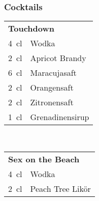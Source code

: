 \subsubsection{Cocktails}
\begin{table}[h!]
  \begin{subtable}[t]{0.3\textwidth}
    \vspace{0pt}
    \begin{tabular}{|rl|} \hline
      \multicolumn{2}{|l|}{\textbf{Touchdown}} \\
      \SI{4}{\centi\litre} & Wodka \\
      \SI{2}{\centi\litre} & Apricot Brandy \\
      \SI{6}{\centi\litre} & Maracujasaft \\
      \SI{2}{\centi\litre} & Orangensaft \\
      \SI{2}{\centi\litre} & Zitronensaft \\
      \SI{1}{\centi\litre} & Grenadinensirup \\ \hline
    \end{tabular}
  \end{subtable}
  ~
  \begin{subtable}[t]{0.3\textwidth}
    \vspace{0pt}
    \begin{tabular}{|rl|} \hline
      \multicolumn{2}{|l|}{\textbf{Sex on the Beach}} \\
      \SI{4}{\centi\litre} & Wodka \\
      \SI{2}{\centi\litre} & Peach Tree Likör \\

\end{tabular}
\end{subtable}
\end{table}
